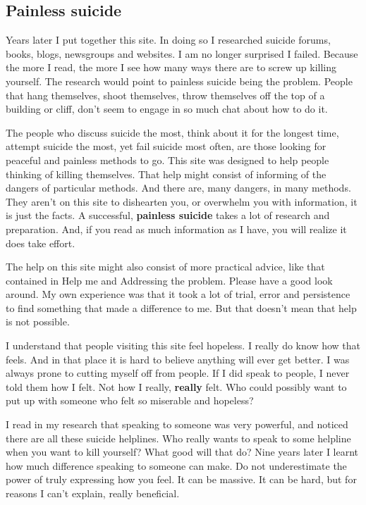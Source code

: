 \documentclass[12pt]{article}
\begin{document}
\subsection{Painless suicide}

Years later I put together this site. In doing so I researched suicide forums, books, blogs, newsgroups and websites. I am no longer surprised I failed. Because the more I read, the more I see how many ways there are to screw up killing yourself. The research would point to painless suicide being the problem. People that hang themselves, shoot themselves, throw themselves off the top of a building or cliff, don’t seem to engage in so much chat about how to do it.

The people who discuss suicide the most, think about it for the longest time, attempt suicide the most, yet fail suicide most often, are those looking for peaceful and painless methods to go. This site was designed to help people thinking of killing themselves. That help might consist of informing of the dangers of particular methods. And there are, many dangers, in many methods. They aren’t on this site to dishearten you, or overwhelm you with information, it is just the facts. A successful, \textbf{painless suicide} takes a lot of research and preparation. And, if you read as much information as I have, you will realize it does take effort.

The help on this site might also consist of more practical advice, like that contained in Help me and Addressing the problem. Please have a good look around. My own experience was that it took a lot of trial, error and persistence to find something that made a difference to me. But that doesn’t mean that help is not possible.

I understand that people visiting this site feel hopeless. I really do know how that feels. And in that place it is hard to believe anything will ever get better. I was always prone to cutting myself off from people. If I did speak to people, I never told them how I felt. Not how I really, \textbf{really} felt. Who could possibly want to put up with someone who felt so miserable and hopeless?

I read in my research that speaking to someone was very powerful, and noticed there are all these suicide helplines. Who really wants to speak to some helpline when you want to kill yourself? What good will that do? Nine years later I learnt how much difference speaking to someone can make. Do not underestimate the power of truly expressing how you feel. It can be massive. It can be hard, but for reasons I can’t explain, really beneficial.
\end{document}
